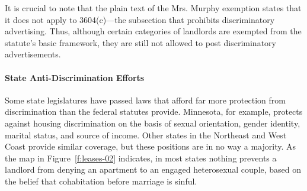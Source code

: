 It is crucial to note that the plain text of the Mrs. Murphy exemption states
that it does not apply to 3604(c)---the subsection that prohibits
discriminatory advertising.  Thus, although certain categories of landlords are
exempted from the statute's basic framework, they are still not allowed to post
discriminatory advertisements.

\paragraph{State Anti-Discrimination Efforts}

Some state legislatures have passed laws that afford far more protection from
discrimination than the federal statutes provide.  Minnesota, for example,
protects against housing discrimination on the basis of sexual orientation,
gender identity, marital status, and source of income.  Other states in the
Northeast and West Coast provide similar coverage, but these positions are in
no way a majority.  As the map in Figure~\ref{f:leases-02} indicates, in most
states nothing prevents a landlord from denying an apartment to an engaged
heterosexual couple, based on the belief that cohabitation before marriage is
sinful.




